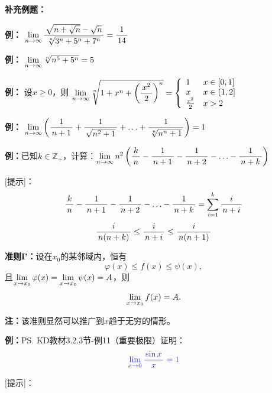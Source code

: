 {\bf 补充例题：}

{\bf 例：} $\limn\df{\sqrt{n+\sqrt n}-\sqrt n}{\sqrt[n]{3^n+5^n+7^n}}=\df1{14}$


{\bf 例：} $\limn\sqrt[n]{n^5+5^n}=5$

{\bf 例：} 设$x\geq 0$，则
$\limn\sqrt[n]{1+x^n+\left(\df{x^2}2\right)^n}=
\left\{\begin{array}{ll}
1&x\in[0,1]\\ x & x\in(1,2]\\ \frac{x^2}2& x>2
\end{array}\right.$

{\bf 例：} $\limn\left(\df1{n+1}+\df1{\sqrt{n^2+1}}+\ldots
+\df1{\sqrt[n]{n^n+1}}\right)=1$

{\bf 例：}已知$k\in\mathbb{Z}_+$，计算：$\limn n^2\left(\df kn-\df1{n+1}-\df1{n+2}
-\ldots-\df1{n+k}\right)$

[提示]：
$$\df kn-\df1{n+1}-\df1{n+2}-\ldots-\df1{n+k}=\sum\limits_{i=1}^k\df{i}{n+i}$$
$$\df i{n(n+k)}\leq\df{i}{n+i}\leq\df i{n(n+1)}$$

{\bf 准则I'：}设在$x_0$的某邻域内，恒有
$$\varphi(x)\leq f(x)\leq\psi(x), $$
且$\limx{x_0}\varphi(x)=\limx{x_0}\psi(x)=A$，则
$$\limx{x_0}f(x)=A.$$

{\bf 注：}该准则显然可以推广到$x$趋于无穷的情形。

{\bf 例：}\ps{KD教材3.2.3节-例11}（重要极限）证明：
$$\b\limx{0}\df {\sin x}x=1$$

[提示]：
\begin{center}
\end{center}

